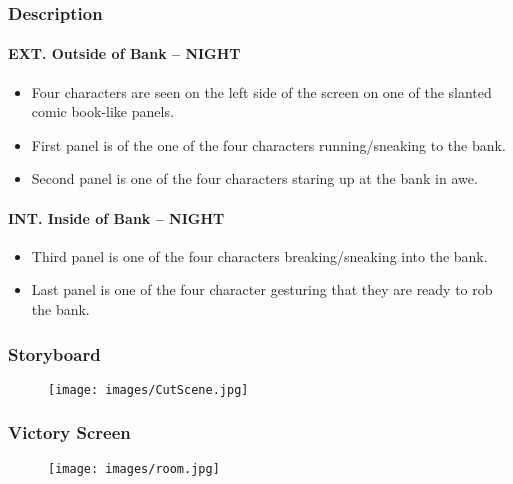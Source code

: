 \documentclass[10pt]{report}
\begin{document}
\subsubsection{Description}

\paragraph{EXT. Outside of Bank -- NIGHT} \mbox \\
\begin{itemize}
    \item Four characters are seen on the left side of the screen on one of the slanted comic book-like panels. 
    \item First panel is of the one of the four characters running/sneaking to the bank.
    \item Second panel is one of the four characters staring up at the bank in awe.
\end{itemize}
\paragraph{INT. Inside of Bank -- NIGHT} \mbox \\
\begin{itemize}
    \item Third panel is one of the four characters breaking/sneaking into the bank.
    \item Last panel is one of the four character gesturing that they are ready to rob the bank.
\end{itemize}

\subsubsection{Storyboard}

\begin{figure}[H]
    \centering
    \texttt{[image: images/CutScene.jpg]}
    \caption{}
    \label{fig:storyboard}
\end{figure}

\subsubsection{Victory Screen}

\begin{figure}[H]
    \centering
    \texttt{[image: images/room.jpg]}
    \caption{}
    \label{fig:victory}
\end{figure}
\end{document}
